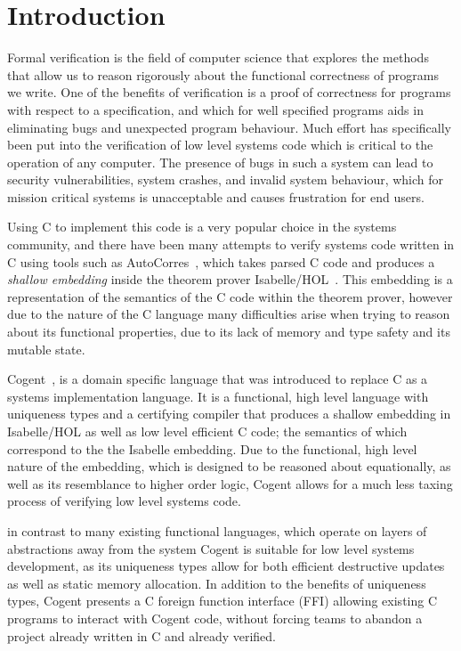 \chapter{Introduction}\label{ch:intro}

Formal verification is the field of computer science that explores the methods that allow us to
  reason rigorously about the functional correctness of programs we write.
One of the benefits of verification is a proof of correctness for programs with respect to a specification,
  and which for well specified programs aids in eliminating bugs and unexpected program behaviour.
Much effort has specifically been put into the verification of low level systems code
  which is critical to the operation of any computer.
The presence of bugs in such a system can lead to security vulnerabilities,
  system crashes, and invalid system behaviour, which for mission critical systems is unacceptable and
  causes frustration for end users.

Using C to implement this code is a very popular choice in the systems community,
  and there have been many attempts to verify systems code written in C using tools such as 
  AutoCorres~\citep{AutoCorres}, which takes parsed C code and produces a \textit{shallow embedding}
  inside the theorem prover Isabelle/HOL~\citep{IsabelleTutorial}.
This embedding is a representation of the semantics of the C code within the theorem prover,
  however due to the nature of the C language many difficulties arise when trying to
  reason about its functional properties, due to its lack of memory and type safety 
  and its mutable state.

Cogent~\citep{ICFPCogent}, is a domain specific language that was introduced to replace C as a systems
  implementation language.
It is a functional, high level language with uniqueness types and a certifying compiler
  that produces a shallow embedding in Isabelle/HOL as well as low level efficient C code;
  the semantics of which correspond to the the Isabelle embedding.
Due to the functional, high level nature of the embedding,
  which is designed to be reasoned about equationally, as well as its resemblance to higher order logic,
  Cogent allows for a much less taxing process of verifying low level systems code.

in contrast to many existing functional languages, which operate
  on layers of abstractions away from the system Cogent is suitable for low level systems development,
  as its uniqueness types allow for both efficient destructive updates as well as static memory allocation.
In addition to the benefits of uniqueness types, Cogent presents a C foreign function interface (FFI) allowing existing C programs
 to interact with Cogent code, without forcing teams to abandon a project already written in C and already verified.

